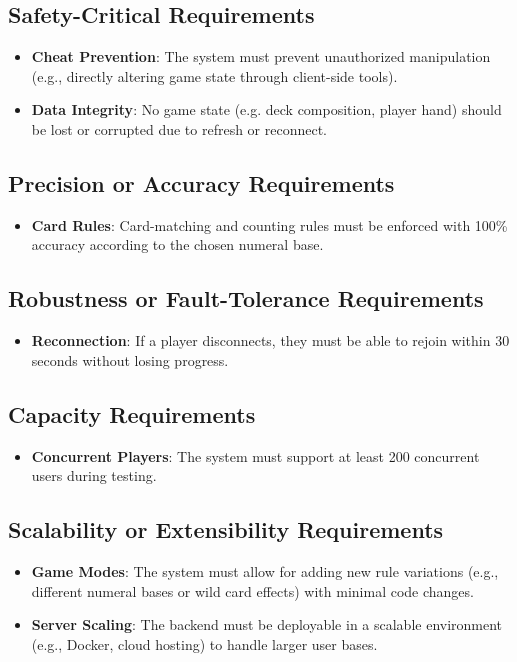 \documentclass[12pt]{article}
\begin{document}
\subsection{Safety-Critical Requirements}
	\begin{itemize}
		\item\textbf{Cheat Prevention}: The system must prevent unauthorized manipulation (e.g., directly altering game state through client-side tools).
		\item \textbf{Data Integrity}: No game state (e.g. deck composition, player hand) should be lost or corrupted due to refresh or reconnect.
	\end{itemize}

\subsection{Precision or Accuracy Requirements}
	\begin{itemize}
		\item\textbf{Card Rules}: Card-matching and counting rules must be enforced with 100\% accuracy according to the chosen numeral base.
	\end{itemize}

\subsection{Robustness or Fault-Tolerance Requirements}
	\begin{itemize}
		\item\textbf{Reconnection}: If a player disconnects, they must be able to rejoin within 30 seconds without losing progress.
	\end{itemize}

\subsection{Capacity Requirements}
	\begin{itemize}
		\item\textbf{Concurrent Players}: The system must support at least 200 concurrent users during testing.
	\end{itemize}

\subsection{Scalability or Extensibility Requirements}
	\begin{itemize}
		\item\textbf{Game Modes}: The system must allow for adding new rule variations (e.g., different numeral bases or wild card effects) with minimal code changes.
		\item \textbf{Server Scaling}: The backend must be deployable in a scalable environment (e.g., Docker, cloud hosting) to handle larger user bases.
	\end{itemize}
\end{document}
